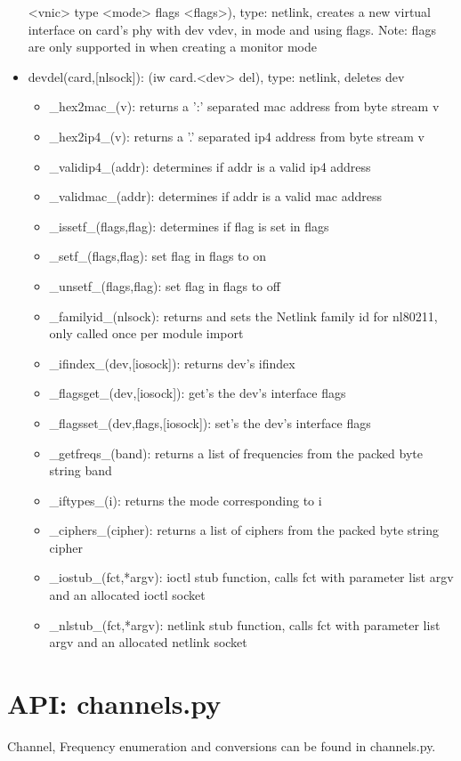 \documentclass[11pt]{article}
\begin{document}
\begin{appendices}
\begin{itemize}
<vnic> type <mode> flags <flags>), type: netlink, creates a new virtual interface
on card's phy with dev vdev, in mode and using flags. Note: flags are only supported
in when creating a monitor mode
\item devdel(card,[nlsock]): (iw card.<dev> del), type: netlink, deletes dev
\begin{itemize}
\item \_hex2mac\_(v): returns a ':' separated mac address from byte stream v
\item \_hex2ip4\_(v): returns a '.' separated ip4 address from byte stream v
\item \_validip4\_(addr): determines if addr is a valid ip4 address
\item \_validmac\_(addr): determines if addr is a valid mac address
\item \_issetf\_(flags,flag): determines if flag is set in flags
\item \_setf\_(flags,flag): set flag in flags to on
\item \_unsetf\_(flags,flag): set flag in flags to off
\item \_familyid\_(nlsock): returns and sets the Netlink family id for nl80211, 
only called once per module import
\item \_ifindex\_(dev,[iosock]): returns dev's ifindex
\item \_flagsget\_(dev,[iosock]): get's the dev's interface flags
\item \_flagsset\_(dev,flags,[iosock]): set's the dev's interface flags
\item \_getfreqs\_(band): returns a list of frequencies from the packed byte string
band
\item \_iftypes\_(i): returns the mode corresponding to i
\item \_ciphers\_(cipher): returns a list of ciphers from the packed byte string
cipher
\item \_iostub\_(fct,*argv): ioctl stub function, calls fct with parameter list argv
and an allocated ioctl socket
\item \_nlstub\_(fct,*argv): netlink stub function, calls fct with parameter list
argv and an allocated netlink socket
\end{itemize}
\end{itemize}

\section{API: channels.py}\label{sec:channels.api}
Channel, Frequency enumeration and conversions can be found in channels.py.


\end{appendices}
\end{document}
